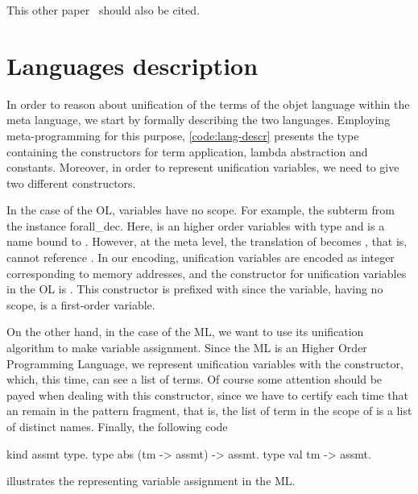 \documentclass[sigconf,natbib=false]{acmart}
\begin{document}
This other paper~\cite{10.1007/978-3-031-38499-8_25} should also be cited.

\section{Languages description}
\label{sec:lang-spec}




\def\eqfo{eq\_fo\xspace}

In order to reason about unification of the terms of the objet language within the
meta language, we start by formally describing the two languages. Employing
meta-programming for this purpose, \cref{code:lang-descr} presents the type
 containing the constructors for term application, lambda abstraction
and constants. Moreover, in order to represent unification variables, we need 
to give two different constructors. 

In the case of the OL, variables have no scope. For example, the subterm
 from the instance forall\_dec. Here,  is an higher order
variables with type  and  is a name bound to
. However, at the meta level, the translation of  becomes
, that is,  cannot reference . In our
encoding, unification variables are encoded as integer corresponding to memory
addresses, and the constructor for unification variables in the OL is
. This constructor is prefixed with  since the
variable, having no scope, is a first-order variable.

On the other hand, in the case of the ML, we want to use its unification
algorithm to make variable assignment. Since the ML is an Higher Order
Programming Language, we represent unification variables with the 
constructor, which, this time, can see a list of terms. Of course some attention
should be payed when dealing with this constructor, since we have to certify
each time that an  remain in the pattern fragment, that is, the
list of term in the scope of  is a list of distinct names. Finally,
the following code

\begin{elpicode}
  kind assmt type.
  type abs (tm -> assmt) -> assmt.
  type val tm -> assmt.
\end{elpicode}

\noindent
illustrates the  representing variable assignment in the ML.
\end{document}
